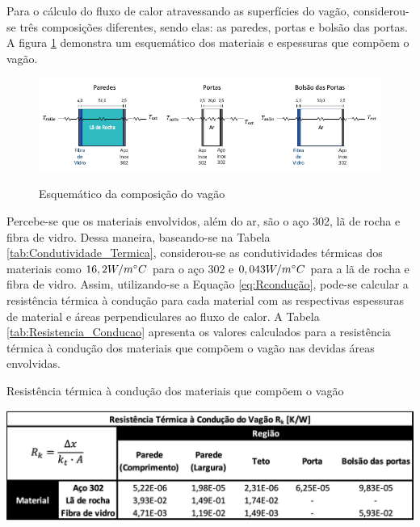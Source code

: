 \documentclass[acronym,symbols,table]{fei}
\begin{document}
Para o cálculo do fluxo de calor atravessando as superfícies do vagão, considerou-se três composições diferentes, sendo elas: as paredes, portas e bolsão das portas. A figura \ref{fig:Composicao_Vagao} demonstra um esquemático dos materiais e espessuras que compõem o vagão.

\begin{figure}[!htb] 
    \centering
    \caption{Esquemático da composição do vagão}
    \includegraphics[width=1.0\linewidth]{Imagens/Composicao_Vagao.png}
    \label{fig:Composicao_Vagao}
\end{figure}

Percebe-se que os materiais envolvidos, além do ar, são o aço 302, lã de rocha e fibra de vidro. Dessa maneira, baseando-se na Tabela \ref{tab:Condutividade_Termica}, considerou-se as condutividades térmicas dos materiais como $16,2 \space W/m^\circ C$ para o aço 302 e $0,043 \space W/m^\circ C$ para a lã de rocha e fibra de vidro. Assim, utilizando-se a Equação \ref{eq:Rcondução}, pode-se calcular a resistência térmica à condução para cada material com as respectivas espessuras de material e áreas perpendiculares ao fluxo de calor. A Tabela \ref{tab:Resistencia_Conducao} apresenta os valores calculados para a resistência térmica à condução dos materiais que compõem o vagão nas devidas áreas envolvidas.

\begin{table}[!htb]
 \centering
    \caption{Resistência térmica à condução dos materiais que compõem o vagão}
    \includegraphics[width=1.0\linewidth]{Tabelas/Resistencia_Conducao.png}
    \label{tab:Resistencia_Conducao}
\end{table}
\end{document}
